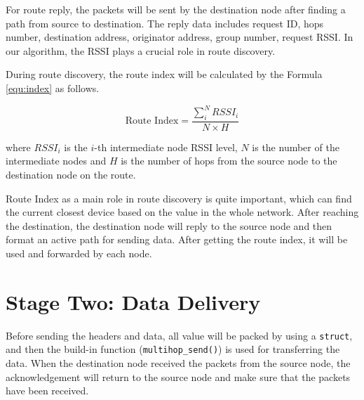 For route reply, the packets will be sent by the destination node after finding a path from source to destination. The reply data includes request ID, hops number, destination address, originator address, group number, request RSSI. In our algorithm, the RSSI plays a crucial role in route discovery.  

During route discovery, the route index will be calculated by the Formula \ref{equ:index} as follows.

\begin{equation}
    \text{Route Index} = 
    \frac{\sum_i^N{RSSI_i}}{N \times H}
\label{equ:index}
\end{equation}

where $RSSI_i$ is the $i$-th intermediate node RSSI level, $N$ is the number of the intermediate nodes and $H$ is the number of hops from the source node to the destination node on the route.  

Route Index as a main role in route discovery is quite important, which can find the current closest device based on the value in the whole network. 
After reaching the destination, the destination node will reply to the source node and then format an active path for sending data. After getting the route index, it will be used and forwarded by each node. 

\section{Stage Two: Data Delivery}

Before sending the headers and data, all value will be packed by using a \texttt{struct}, and then the build-in function (\texttt{multihop\_send()}) is used for transferring the data. When the destination node received the packets from the source node, the acknowledgement will return to the source node and make sure that the packets have been received.







